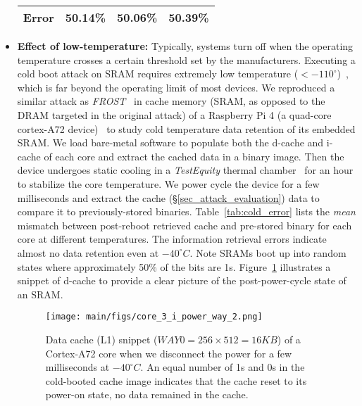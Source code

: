 \begin{itemize}
\begin{table}
{\begin{tabular}{l|c|l|c}
\textbf{Error}       & \multicolumn{1}{l|}{50.14\%} & 50.06\%                 & \multicolumn{1}{l}{50.39\%} \\ \hline
\end{tabular}
    }

\end{table}






\item \textbf{Effect of low-temperature:} Typically, systems turn off when the operating temperature crosses a certain threshold set by the manufacturers.
Executing a cold boot attack on SRAM requires extremely low temperature ($<-110^\circ$)~\cite{anagnostopoulos2018low}, which is far beyond the operating limit of most devices. 
We reproduced a similar attack as \textit{FROST}~\cite{frost_2013} in cache memory (SRAM, as opposed to the DRAM targeted in the original attack) of a Raspberry Pi 4 (a quad-core cortex-A72 device)~\cite{A72} to study cold temperature data retention of its embedded SRAM. 
We load bare-metal software to populate both the d-cache and i-cache of each core and extract the cached data in a binary image. 
Then the device undergoes static cooling in a \textit{TestEquity} thermal chamber~\cite{testequity} for an hour to stabilize the core temperature. We power cycle the device for a few milliseconds  and extract the cache (\S\ref{sec_attack_evaluation}) data to compare it to previously-stored binaries. 
Table~\ref{tab:cold_error} lists the \textit{mean} mismatch between post-reboot retrieved cache and pre-stored binary for each core at different temperatures. 
The information retrieval errors indicate almost no data retention even at $-40^\circ C$.
Note SRAMs boot up into random states where approximately 50\% of the bits are 1s.
Figure~\ref{fig:power_on} illustrates a snippet of d-cache to provide a clear picture of the post-power-cycle state of an SRAM.


 \begin{figure}
    \centering
    \texttt{[image: main/figs/core\_3\_i\_power\_way\_2.png]}
    \caption{ Data cache (L1) snippet ($WAY0 = 256\times512 = 16KB$) of a Cortex-A72 core   when we disconnect the power for a few milliseconds at $-40^\circ C$. An equal number of 1s and 0s in the cold-booted cache image indicates that the cache reset to its power-on state, \ie no data remained in the cache.}
    \label{fig:power_on} 
\end{figure}
 \end{itemize}
